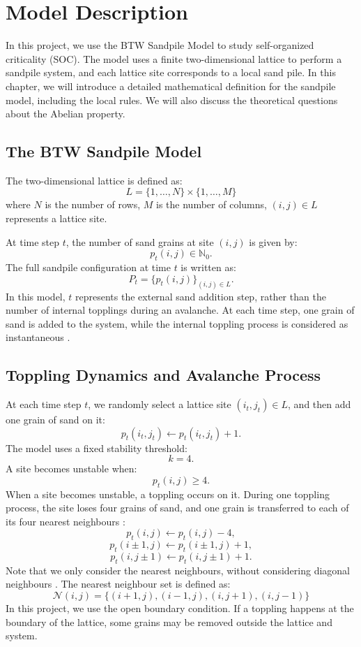 \chapter{Model Description}

In this project, we use the BTW Sandpile Model to study self-organized criticality (SOC). The model uses a finite two-dimensional lattice to perform a sandpile system, and each lattice site corresponds to a local sand pile. In this chapter, we will introduce a detailed mathematical definition for the sandpile model, including the local rules. We will also discuss the theoretical questions about the Abelian property. 

\section{The BTW Sandpile Model}

The two-dimensional lattice is defined as:
$$
L=\{1,\ldots,N\}\times\{1,\ldots,M\}
$$
where $N$ is the number of rows, $M$ is the number of columns, $(i,j)\in L$ represents a lattice site.

At time step $t$, the number of sand grains at site $(i,j)$ is given by:
$$
p_t(i,j)\in\mathbb{N}_0. 
$$
The full sandpile configuration at time $t$ is written as:
$$
P_t=\{p_t(i,j)\}_{(i,j)\in L}. 
$$
In this model, $t$ represents the external sand addition step, rather than the number of internal topplings during an avalanche. At each time step, one grain of sand is added to the system, while the internal toppling process is considered as instantaneous \citep{Project2020}. 



\section{Toppling Dynamics and Avalanche Process}

At each time step $t$, we randomly select a lattice site $(i_t,j_t)\in L$, and then add one grain of sand on it:
$$
p_t(i_t,j_t)\leftarrow p_t(i_t,j_t)+1. 
$$
The model uses a fixed stability threshold:
$$
k=4. 
$$
A site becomes unstable when:
$$
p_t(i,j)\ge4. 
$$
When a site becomes unstable, a toppling occurs on it. During one toppling process, the site loses four grains of sand, and one grain is transferred to each of its four nearest neighbours \citep{Project2020}:
$$
p_t(i,j)\leftarrow p_t(i,j)-4, 
$$
$$
p_t(i\pm1,j)\leftarrow p_t(i\pm1,j)+1, 
$$
$$
p_t(i,j\pm1)\leftarrow p_t(i,j\pm1)+1. 
$$
Note that we only consider the nearest neighbours, without considering diagonal neighbours \citep{Project2020}. The nearest neighbour set is defined as:
$$
\mathcal{N}(i,j)
=
\{
(i+1,j),
(i-1,j),
(i,j+1),
(i,j-1)
\}
$$
In this project, we use the open boundary condition. If a toppling happens at the boundary of the lattice, some grains may be removed outside the lattice and system. 

